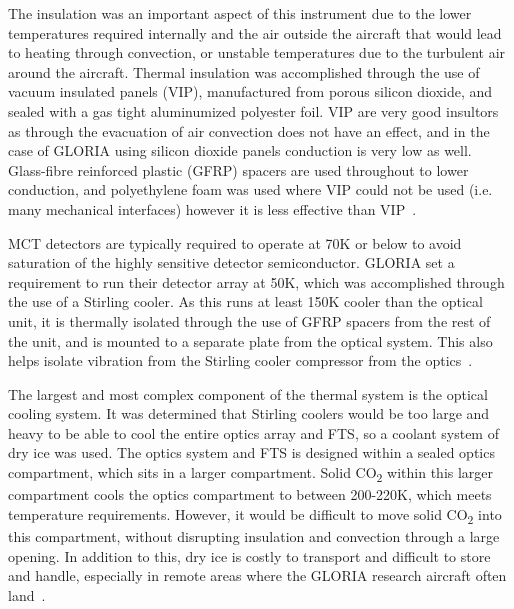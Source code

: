 The insulation was an important aspect of this instrument due to the lower temperatures required internally and the air outside the aircraft that would lead to heating through convection, or unstable temperatures due to the turbulent air around the aircraft. Thermal insulation was accomplished through the use of vacuum insulated panels (VIP), manufactured from porous silicon dioxide, and sealed with a gas tight aluminumized polyester foil. VIP are very good insultors as through the evacuation of air convection does not have an effect, and in the case of GLORIA using silicon dioxide panels conduction is very low as well. Glass-fibre reinforced plastic (GFRP) spacers are used throughout to lower conduction, and polyethylene foam was used where VIP could not be used (i.e. many mechanical interfaces) however it is less effective than VIP~\citep{GLORIA_thermalmech}.

MCT detectors are typically required to operate at 70K or below to avoid saturation of the highly sensitive detector semiconductor. GLORIA set a requirement to run their detector array at 50K, which was accomplished through the use of a Stirling cooler. As this runs at least 150K cooler than the optical unit, it is thermally isolated through the use of GFRP spacers from the rest of the unit, and is mounted to a separate plate from the optical system. This also helps isolate vibration from the Stirling cooler compressor from the optics~\citep{GLORIA_thermalmech}.

The largest and most complex component of the thermal system is the optical cooling system. It was determined that Stirling coolers would be too large and heavy to be able to cool the entire optics array and FTS, so a coolant system of dry ice was used. The optics system and FTS is designed within a sealed optics compartment, which sits in a larger compartment. Solid CO\textsubscript{2} within this larger compartment cools the optics compartment to between 200-220K, which meets temperature requirements. However, it would be difficult to move solid CO\textsubscript{2} into this compartment, without disrupting insulation and convection through a large opening. In addition to this, dry ice is costly to transport and difficult to store and handle, especially in remote areas where the GLORIA research aircraft often land~\citep{GLORIA_thermalmech}.

